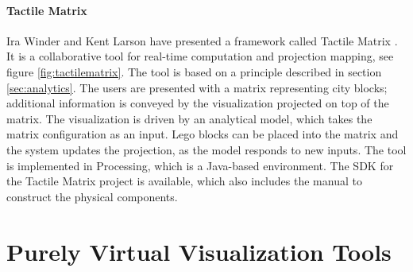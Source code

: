 \paragraph{Tactile Matrix}
Ira Winder and Kent Larson have presented a framework called Tactile Matrix \cite{winderTangible2017}. It is a collaborative tool for real-time computation and projection mapping, see figure \ref{fig:tactilematrix}. The tool is based on a principle described in section \ref{sec:analytics}. The users are presented with a matrix representing city blocks; additional information is conveyed by the visualization projected on top of the matrix. The visualization is driven by an analytical model, which takes the matrix configuration as an input. Lego blocks can be placed into the matrix and the system updates the projection, as the model responds to new inputs. The tool is implemented in Processing, which is a Java-based environment. The SDK for the Tactile Matrix project is available, which also includes the manual to construct the physical components.




\section{Purely Virtual Visualization Tools}



